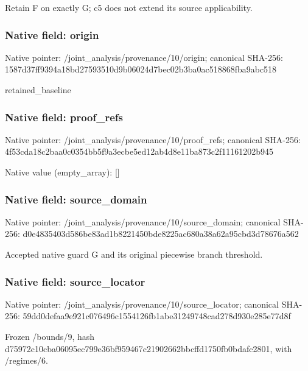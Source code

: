 \documentclass[10pt,a4paper]{article}
\begin{document}
\begingroup\raggedright\sloppy Retain F on exactly G;\allowbreak{} c5 does not extend its source applicability.\par\endgroup

\subsubsection{Native field: origin}
Native pointer: /joint\_\allowbreak{}analysis/provenance/10/origin; canonical SHA-256: 1587d37ff9394a18bd27593510d9b06024d7bec02b3ba0ac518868fba9abc518

\begingroup\raggedright\sloppy retained\_\allowbreak{}baseline\par\endgroup

\subsubsection{Native field: proof\_\allowbreak{}refs}
Native pointer: /joint\_\allowbreak{}analysis/provenance/10/proof\_\allowbreak{}refs; canonical SHA-256: 4f53cda18c2baa0c0354bb5f9a3ecbe5ed12ab4d8e11ba873c2f11161202b945

Native value (empty\_\allowbreak{}array): []

\subsubsection{Native field: source\_\allowbreak{}domain}
Native pointer: /joint\_\allowbreak{}analysis/provenance/10/source\_\allowbreak{}domain; canonical SHA-256: d0e4835403d586be83ad1b8221450bde8225ac680a38a62a95cbd3d78676a562

\begingroup\raggedright\sloppy Accepted native guard G and its original piecewise branch threshold.\par\endgroup

\subsubsection{Native field: source\_\allowbreak{}locator}
Native pointer: /joint\_\allowbreak{}analysis/provenance/10/source\_\allowbreak{}locator; canonical SHA-256: 59dd0defaa9e921c076496c1554126fb1abe31249748cad278d930e285e77d8f

\begingroup\raggedright\sloppy Frozen /\allowbreak{}bounds/\allowbreak{}9,\allowbreak{} hash d75972c10cba06095ec799e36bf959467c21902662bbcffd1750fb0bdafc2801,\allowbreak{} with /\allowbreak{}regimes/\allowbreak{}6.\par\endgroup
\end{document}

